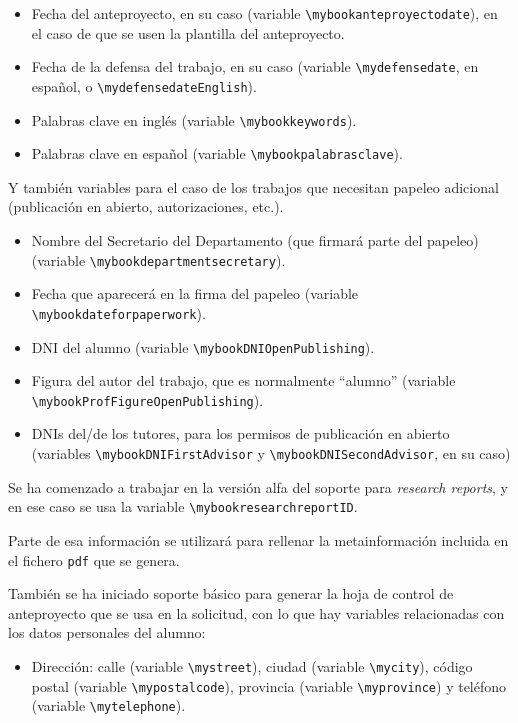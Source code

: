 \begin{itemize}
\item Fecha del anteproyecto, en su caso (variable \texttt{\textbackslash{}mybookanteproyectodate}), en el caso de que se usen la plantilla del anteproyecto.
\item Fecha de la defensa del trabajo, en su caso (variable
  \texttt{\textbackslash{}mydefensedate}, en español, o
  \texttt{\textbackslash{}mydefensedateEnglish}).
\item Palabras clave en inglés (variable \texttt{\textbackslash{}mybookkeywords}).
\item Palabras clave en español (variable \texttt{\textbackslash{}mybookpalabrasclave}).
\end{itemize}

Y también variables para el caso de los trabajos que necesitan papeleo
adicional (publicación en abierto, autorizaciones, etc.).

\begin{itemize}
\item Nombre del Secretario del Departamento (que firmará parte del papeleo)
  (variable \texttt{\textbackslash{}mybookdepartmentsecretary}).
\item Fecha que aparecerá en la firma del papeleo (variable \texttt{\textbackslash{}mybookdateforpaperwork}).
\item DNI del alumno (variable
  \texttt{\textbackslash{}mybookDNIOpenPublishing}).
\item Figura del autor del trabajo, que es normalmente ``alumno''
  (variable \texttt{\textbackslash{}mybookProfFigureOpenPublishing}).
\item DNIs del/de los tutores, para los permisos de publicación en
  abierto (variables \texttt{\textbackslash{}mybookDNIFirstAdvisor} y
  \texttt{\textbackslash{}mybookDNISecondAdvisor}, en su caso)
\end{itemize}

Se ha comenzado a trabajar en la versión alfa del soporte para
\textit{research reports}, y en ese caso se usa la variable
\texttt{\textbackslash{}mybookresearchreportID}.

Parte de esa información se utilizará para rellenar la metainformación
incluida en el fichero \texttt{pdf} que se genera.

También se ha iniciado soporte básico para generar la hoja de control de
anteproyecto que se usa en la solicitud, con lo que hay variables
relacionadas con los datos personales del alumno:

\begin{itemize}
\item Dirección: calle (variable \texttt{\textbackslash{}mystreet}),
  ciudad (variable \texttt{\textbackslash{}mycity}), código postal
  (variable \texttt{\textbackslash{}mypostalcode}), provincia (variable
  \texttt{\textbackslash{}myprovince}) y teléfono (variable
  \texttt{\textbackslash{}mytelephone}).
\end{itemize}

